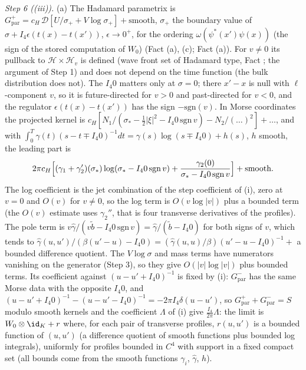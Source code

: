 \emph{Step 6 ((iii)).} (a) The Hadamard parametrix is $G^{+}_{\mathrm{par}} = c_{H}\,\mathcal{D}[U/\sigma_{+} + V\log\sigma_{+}] + \text{smooth}$, $\sigma_{+}$ the boundary value of $\sigma + I_{4}\epsilon(t(x) - t(x'))$, $\epsilon \to 0^{+}$, for the ordering $\omega(\psi^{*}(x')\psi(x))$ (the sign of the stored computation of $W_{0}$) (Fact (a), (c); Fact (a)). For $v \neq 0$ its pullback to $\mathcal{H}\times\mathcal{H}_{v}$ is defined (wave front set of Hadamard type, Fact ; the argument of Step 1) and does not depend on the time function (the bulk distribution does not). The $I_{4}0$ matters only at $\sigma = 0$; there $x' - x$ is null with $\ell$-component $v$, so it is future-directed for $v > 0$ and past-directed for $v < 0$, and the regulator $\epsilon(t(x) - t(x'))$ has the sign $-\mathrm{sgn}(v)$. In Morse coordinates the projected kernel is $c_{H}[N_{1}/(\sigma_{*} - \tfrac12|\xi|^{2} - I_{4}0\,\mathrm{sgn}\,v) - N_{2}/(\ldots)^{2}] + \ldots$, and with $\int_{0}^{T}\gamma(t)(s - t \mp I_{4}0)^{-1}dt = \gamma(s)\log(s \mp I_{4}0) + h(s)$, $h$ smooth, the leading part is
\[
2\pi c_{H}\Bigl[(\gamma_{1} + \gamma_{2}')(\sigma_{*})\log(\sigma_{*} - I_{4}0\,\mathrm{sgn}\,v) + \frac{\gamma_{2}(0)}{\sigma_{*} - I_{4}0\,\mathrm{sgn}\,v}\Bigr] + \text{smooth}.
\]
The log coefficient is the jet combination of the step coefficient of (i), zero at $v = 0$ and $O(v)$ for $v \neq 0$, so the log term is $O(v\log|v|)$ plus a bounded term (the $O(v)$ estimate uses $\gamma_{2}''$, that is four transverse derivatives of the profiles). The pole term is $v\hat\gamma/(v\tilde b - I_{4}0\,\mathrm{sgn}\,v) = \hat\gamma/(\tilde b - I_{4}0)$ for both signs of $v$, which tends to $\hat\gamma(u, u')/(\beta(u'-u) - I_{4}0) = (\hat\gamma(u, u)/\beta)(u' - u - I_{4}0)^{-1} + $ a bounded difference quotient. The $V\log\sigma$ and mass terms have numerators vanishing on the generator (Step 3), so they give $O(|v|\log|v|)$ plus bounded terms. Its coefficient against $(u - u' + I_{4}0)^{-1}$ is fixed by (i): $G^{-}_{\mathrm{par}}$ has the same Morse data with the opposite $I_{4}0$, and $(u - u' + I_{4}0)^{-1} - (u - u' - I_{4}0)^{-1} = -2\pi I_{4}\delta(u - u')$, so $G^{+}_{\mathrm{par}} + G^{-}_{\mathrm{par}} = S$ modulo smooth kernels and the coefficient $\Lambda$ of (i) give $\tfrac{I_{4}}{2\pi}\Lambda$: the limit is $W_{0}\otimes\id_{K} + r$ where, for each pair of transverse profiles, $r(u, u')$ is a bounded function of $(u, u')$ (a difference quotient of smooth functions plus bounded log integrals), uniformly for profiles bounded in $C^{4}$ with support in a fixed compact set (all bounds come from the smooth functions $\gamma_{i}$, $\hat\gamma$, $h$).
